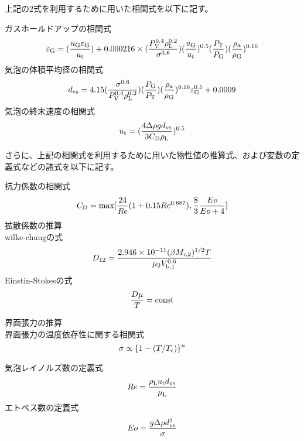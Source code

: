 \documentclass[platex, a4j]{jsarticle}
\begin{document}
上記の2式を利用するために用いた相関式を以下に記す。

ガスホールドアップの相関式
\begin{equation}
    \varepsilon_{{\rm G}} = (\frac{u_{{\rm G}}\varepsilon_{{\rm G}}}{u_{{\rm t}}}) + 0.000216 \times(\frac{P_{{\rm V}}^{0.4} \rho_{{\rm L}}^{0.2} }{ \sigma^{0.6}})(\frac{u_{{\rm G}}}{u_{{\rm t}}})^{0.5}(\frac{P_{{\rm T}}}{P_{{\rm G}}})(\frac{\rho_{{\rm a}}}{\rho_{{\rm G}}})^{0.16}
\end{equation}
気泡の体積平均径の相関式
\begin{equation}
    d_{{\rm vs}} = 4.15 (\frac{\sigma^{0.6}}{P_{{\rm V}}^{0.4} \rho_{{\rm L}}^{0.2}})(\frac{P_{{\rm G}}}{P_{{\rm T}}})(\frac{\rho_{{\rm a}}}{\rho_{{\rm G}}})^{0.16} \varepsilon_{{\rm G}}^{0.5} + 0.0009
\end{equation}
気泡の終末速度の相関式
\begin{equation}
    u_{{\rm t}} = (\frac{4\Delta \rho g d_{{\rm vs}}}{3C_{{\rm D}}\rho_{{\rm L}}})^{0.5}
\end{equation}

さらに、上記の相関式を利用するために用いた物性値の推算式、および変数の定義式などの諸式を以下に記す。

抗力係数の相関式
\begin{equation}
    C_{{\rm D}} = {\rm max}[\frac{24}{Re}(1+0.15Re^{0.687}), \frac{8}{3}\frac{Eo}{Eo+4}]
\end{equation}
拡散係数の推算\\
wilke-changの式
\begin{equation}
    D_{12} = \frac{2.946\times 10^{-11}(\beta M_{{\rm r,2}})^{1/2} T} {\mu_2 V_{{\rm b,1}}^{0.6}}
\end{equation}
Einstin-Stokesの式
\begin{equation}
    \frac{D \mu}{T} = {\rm const}
\end{equation}

界面張力の推算\\
界面張力の温度依存性に関する相関式
\begin{equation}
    \sigma \propto \{1-(T/T_{{\rm c}}) \}^n
\end{equation}

気泡レイノルズ数の定義式
\begin{equation}
    Re = \frac{\rho_{{\rm L}}u_{{\rm t}}d_{{\rm vs}}}{\mu_{{\rm L}}}
\end{equation}
エトベス数の定義式
\begin{equation}
    Eo = \frac{g \Delta \rho d_{{\rm vs}}^2}{\sigma}
\end{equation}
\end{document}
